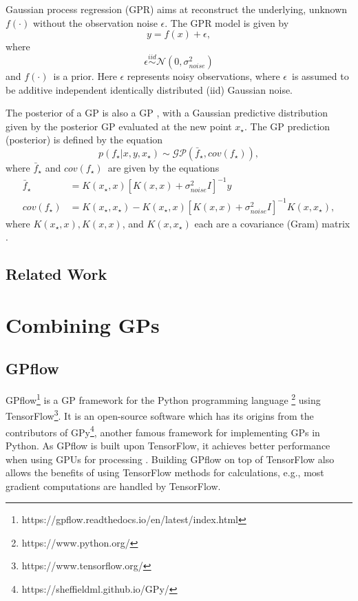 Gaussian process regression (GPR) aims at reconstruct the underlying, unknown $f(\cdot)$ without the observation noise $\epsilon$.
The GPR model is given by
\begin{equation}
    y = f(x) + \epsilon,
\end{equation}
where
\[\epsilon \overset{iid}{\sim} \mathcal{N}(0, \sigma_{noise}^2)\]
and $f(\cdot)$ is a prior.
Here $\epsilon$ represents noisy observations, where $\epsilon$ is assumed to be additive independent identically distributed (iid) Gaussian noise.

The posterior of a GP is also a GP \cite{Rasmussen2006}, with a Gaussian predictive distribution given by the posterior GP evaluated at the new point $x_\star$.
The GP prediction (posterior) is defined by the equation
\begin{equation}
    p(f_\star|x, y, x_\star) \sim \mathcal{GP}(\bar{f}_\star, cov(f_\star)),
\end{equation}
where $\bar{f}_\star$ and $cov(f_\star)$ are given by the equations
\begin{align}
    \bar{f}_\star &= K(x_\star, x)[K(x, x) + \sigma^2_{noise}I]^{-1}y \\
    cov(f_\star) &= K(x_\star, x_\star) - K(x_\star, x)[K(x, x) + \sigma^2_{noise}I]^{-1}K(x,x_\star),
\end{align}
where $K(x_\star, x), K(x, x)$, and $K(x, x_\star)$ each are a covariance (Gram) matrix \cite{Rasmussen2006}.  

\subsection{Related Work}
\section{Combining GPs}

\subsection{GPflow}
GPflow\footnote{https://gpflow.readthedocs.io/en/latest/index.html} \cite{GPflow2017} is a GP framework for the Python programming language \footnote{https://www.python.org/} using TensorFlow\footnote{https://www.tensorflow.org/}.
It is an open-source software which has its origins from the contributors of GPy\footnote{https://sheffieldml.github.io/GPy/}, another famous framework for implementing GPs in Python.
As GPflow is built upon TensorFlow, it achieves better performance when using GPUs for processing \cite{GPflow2017}.
Building GPflow on top of TensorFlow also allows the benefits of using TensorFlow methods for calculations, e.g., most gradient computations are handled by TensorFlow.

